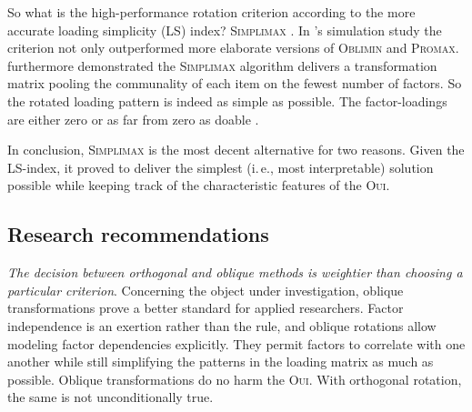 \documentclass[jou, 11pt]{apa7}
\begin{document}
So what is the high-performance rotation criterion according to the more
accurate loading simplicity (LS) index?
\textsc{Simplimax} \parencite{Kiers1994}. In \textcite{Lorenzo-Seva2003}'s
simulation study the criterion not only outperformed more elaborate versions of
\textsc{Oblimin} and \textsc{Promax}. \textcite{Lorenzo-Seva2003} furthermore
demonstrated the \textsc{Simplimax} algorithm delivers a transformation matrix
pooling the communality of each item on the fewest number of factors. So the
rotated loading pattern is indeed as simple as possible. The factor-loadings
are either zero or as far from zero as doable . 

In conclusion, \textsc{Simplimax} is the most decent alternative for two
reasons. Given the LS-index, it proved to deliver the simplest (i.\,e., most
interpretable) solution possible while keeping track of the characteristic
features of the \textsc{Oui}.

\subsection{Research recommendations}

\textit{The decision between orthogonal and oblique methods is weightier than
choosing a particular criterion}. Concerning the object under investigation,
oblique transformations prove a better standard for applied researchers. Factor
independence is an exertion rather than the rule, and oblique rotations allow
modeling factor dependencies explicitly. They permit factors to correlate with
one another while still simplifying the patterns in the loading matrix as much
as possible. Oblique transformations do no harm the \textsc{Oui}. With orthogonal
rotation, the same is not unconditionally true.
\end{document}
